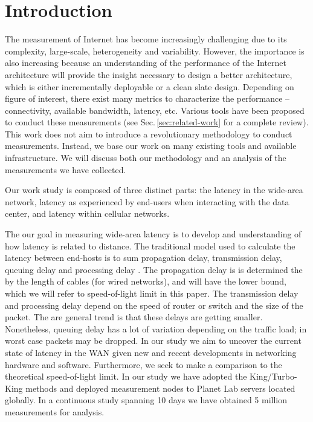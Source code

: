 \section{Introduction}
\label{sec:introduction}

The measurement of Internet has become increasingly challenging due to its complexity, large-scale, heterogeneity and variability. However, the importance is also increasing because an understanding of the performance of the Internet architecture will provide the insight necessary to design a better architecture, which is either incrementally deployable or a clean slate design. Depending on figure of interest, there exist many metrics to characterize the performance -- connectivity, available bandwidth, latency, etc. Various tools have been proposed to conduct these measurements (see Sec.\,\ref{sec:related-work} for a complete review). This work does not aim to introduce a revolutionary methodology to conduct measurements. Instead, we base our work on many existing tools and available infrastructure. We will discuss both our methodology and an analysis of the measurements we have collected.

Our work study is composed of three distinct parts: the latency in the wide-area network,  latency as experienced by end-users when interacting with the data center, and latency within cellular networks.

The our goal in measuring wide-area latency is to develop and understanding of how latency is related to distance. The traditional model used to calculate the latency between end-hosts is to sum propagation delay, transmission delay, queuing delay and processing delay \cite{kurose2001computer}. The propagation delay is is determined the by the length of cables (for wired networks), and will have the lower bound, which we will refer to speed-of-light limit in this paper. The transmission delay and processing delay depend on the speed of router or switch and the size of the packet. The are general trend is that these delays are getting smaller. Nonetheless, queuing delay has a lot of variation depending on the traffic load; in worst case packets may be dropped. In our study we aim to uncover the current state of latency in the WAN given new and recent developments in networking hardware and software. Furthermore, we seek to make a comparison to the theoretical speed-of-light limit. In our study we have adopted the King/Turbo-King \cite{gummadi2002king, leonard2008turbo} methods and deployed measurement nodes to Planet Lab \cite{chun2003planetlab} servers located globally. In a continuous study spanning 10 days we have obtained 5 million measurements for analysis.

